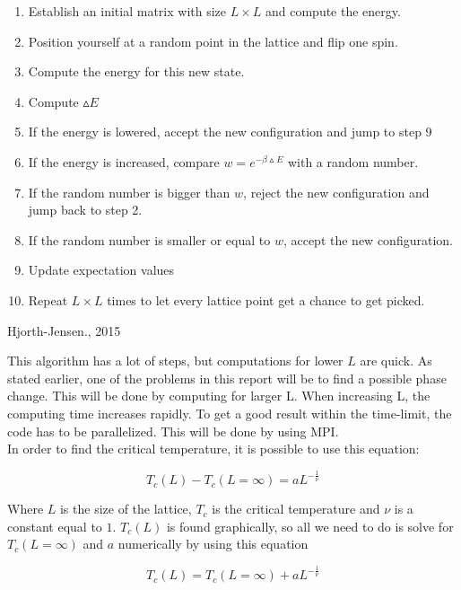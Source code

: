 \documentclass[10pt,a4paper]{article}
\begin{document}
\begin{enumerate}
\item Establish an initial matrix with size $L \times L$ and compute the energy.
\item Position yourself at a random point in the lattice and flip one spin.
\item Compute the energy for this new state.
\item Compute $\vartriangle E$ 
\item If the energy is lowered, accept the new configuration and jump to step 9
\item If the energy is increased, compare $w=e^{-\beta \vartriangle E}$ with a random number.
\item If the random number is bigger than $w$, reject the new configuration and jump back to step 2.
\item If the random number is smaller or equal to $w$, accept the new configuration. 
\item Update expectation values
\item Repeat $L \times L$ times to let every lattice point get a chance to get picked.
\end{enumerate}
\hfill{Hjorth-Jensen., 2015}

\vspace{1cm}
\noindent This algorithm has a lot of steps, but computations for lower $L$ are quick. As stated earlier, one of the problems in this report will be to find a possible phase change. This will be done by computing for larger L. When increasing L, the computing time increases rapidly. To get a good result within the time-limit, the code has to be parallelized. This will be done by using MPI.\\

\noindent In order to find the critical temperature, it is possible to use this equation:

\begin{equation}
T_c(L)-T_c(L=\infty)=aL^{-\frac{1}{\nu}}
\end{equation} 

\noindent Where $L$ is the size of the lattice, $T_c$ is the critical temperature and $\nu$ is a constant equal to $1$. $T_c(L)$ is found graphically, so all we need to do is solve for $T_c(L=\infty)$ and $a$ numerically by using this equation


\begin{equation}
T_c(L)=T_c(L=\infty)+aL^{-\frac{1}{\nu}}
\end{equation}
\end{document}
